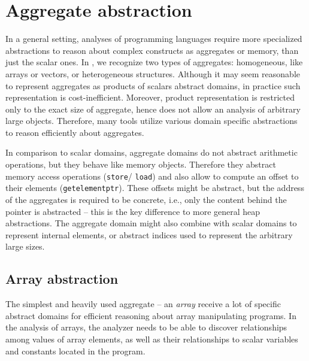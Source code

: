 

\section{Aggregate abstraction}

In a general setting, analyses of programming languages require more
specialized abstractions to reason about complex constructs as aggregates or
memory, than just the scalar ones. In \llvm, we recognize two types of
aggregates: homogeneous, like arrays or vectors, or heterogeneous structures.
Although it may seem reasonable to represent aggregates as products of scalars
abstract domains, in practice such representation is cost-inefficient.
Moreover, product representation is restricted only to the exact size of
aggregate, hence does not allow an analysis of arbitrary large objects.
Therefore, many tools utilize various domain specific abstractions to reason
efficiently about aggregates.

In comparison to scalar domains, aggregate domains do not abstract arithmetic
operations, but they behave like memory objects. Therefore they abstract memory
access operations (\texttt{store}/ \texttt{load}) and also allow to compute an
offset to their elements (\texttt{getelementptr}). These offsets might be
abstract, but the address of the aggregates is required to be concrete, i.e.,
only the content behind the pointer is abstracted -- this is the key difference
to more general heap abstractions. The aggregate domain might also combine with
scalar domains to represent internal elements, or abstract indices used to
represent the arbitrary large sizes.

\subsection{Array abstraction}

The simplest and heavily used aggregate -- an \emph{array} receive a lot of
specific abstract domains for efficient reasoning about array manipulating
programs. In the analysis of arrays, the analyzer needs to be able to discover
relationships among values of array elements, as well as their relationships to
scalar variables and constants located in the program.

